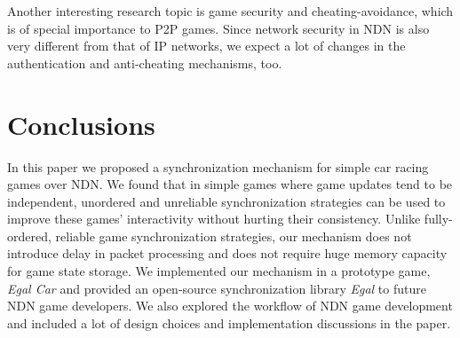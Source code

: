 \documentclass{article}
\begin{document}
Another interesting research topic is game security and cheating-avoidance, which is of special importance to P2P games. Since network security in NDN is also very different from that of IP networks, we expect a lot of changes in the authentication and anti-cheating mechanisms, too.


\section{Conclusions}
\label{conclusions}

In this paper we proposed a synchronization mechanism for simple car racing games over NDN. We found that in simple games where game updates tend to be independent, unordered and unreliable synchronization strategies can be used to improve these games' interactivity without hurting their consistency. Unlike fully-ordered, reliable game synchronization strategies, our mechanism does not introduce delay in packet processing and does not require huge memory capacity for game state storage. We implemented our mechanism in a prototype game, \emph{Egal Car} and provided an open-source synchronization library \emph{Egal} to future NDN game developers. We also explored the workflow of NDN game development and included a lot of design choices and implementation discussions in the paper.



\end{document}
